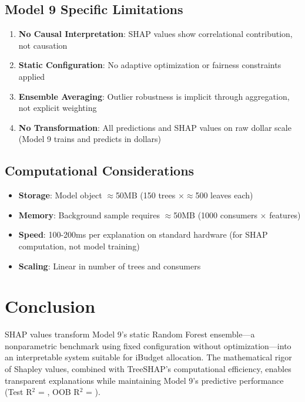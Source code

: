 \subsection{Model 9 Specific Limitations}
\begin{enumerate}
    \item \textbf{No Causal Interpretation}: SHAP values show correlational contribution, not causation
    \item \textbf{Static Configuration}: No adaptive optimization or fairness constraints applied
    \item \textbf{Ensemble Averaging}: Outlier robustness is implicit through aggregation, not explicit weighting
    \item \textbf{No Transformation}: All predictions and SHAP values on raw dollar scale (Model 9 trains and predicts in dollars)
\end{enumerate}

\subsection{Computational Considerations}

\begin{itemize}
    \item \textbf{Storage}: Model object $\approx$50MB (150 trees $\times \approx$500 leaves each)
    \item \textbf{Memory}: Background sample requires $\approx$50MB (1000 consumers $\times$ features)
    \item \textbf{Speed}: 100-200ms per explanation on standard hardware (for SHAP computation, not model training)
    \item \textbf{Scaling}: Linear in number of trees and consumers
\end{itemize}

\section{Conclusion}

SHAP values transform Model 9's static Random Forest ensemble—a nonparametric benchmark using fixed configuration without optimization—into an interpretable system suitable for iBudget allocation. The mathematical rigor of Shapley values, combined with TreeSHAP's computational efficiency, enables transparent explanations while maintaining Model 9's predictive performance (Test R$^2$ = \ModelNineRSquaredTest{}, OOB R$^2$ = \ModelNineOOBRSquared{}).

